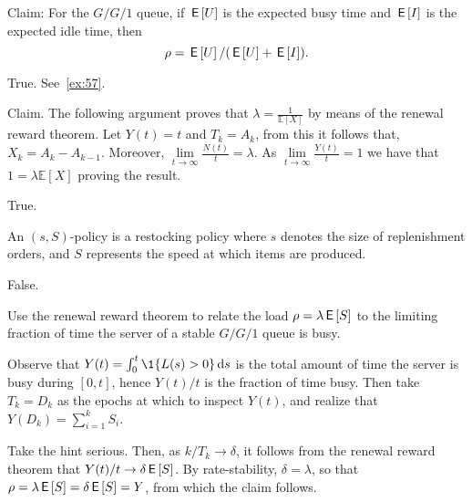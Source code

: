 \documentclass[stochastic-or.tex]{subfiles}
\begin{document}
\begin{truefalse}
Claim:  For the $G/G/1$ queue, if $\,\mathsf{E}\left[U\right]$ is the expected busy time and
 $\,\mathsf{E}\left[I\right]$ is the expected idle time, then
\begin{equation*}
\rho =  \,\mathsf{E}\left[U\right] / (\,\mathsf{E}\left[U\right] +\,\mathsf{E}\left[I\right]).
\end{equation*}
\begin{solution} True. See~\cref{ex:57}.
\end{solution}
\end{truefalse}

\begin{truefalse}
Claim.
The following argument proves that $\lambda=\frac{1}{\mathbb{E}[X]}$ by means of the renewal reward theorem.
Let $Y(t)=t$ and $T_k=A_k$, from this it follows that, $X_k=A_k-A_{k-1}$.
Moreover, $\lim\limits_{t\to\infty}\frac{N(t)}{t}=\lambda$.
As $\lim\limits_{t\to\infty}\frac{Y(t)}{t}=1$ we have that $1=\lambda\mathbb{E}[X]$ proving the result.
    \begin{solution}
        True.
    \end{solution}
\end{truefalse}

\begin{truefalse}
    An $(s,S)$-policy is a restocking policy where $s$ denotes the size of replenishment orders, and $S$ represents the speed at which items are produced.
    \begin{solution}
        False.
    \end{solution}
\end{truefalse}


\begin{exercise}
Use the renewal reward theorem to relate the load $\rho=\lambda \,\mathsf{E}\left[S\right]$ to the limiting fraction of time the server of a stable $G/G/1$ queue is busy.
\begin{hint}
Observe that $Y(t) = \int_0^t \1{\L(s)>0} \d s$ is the total amount of time the server is busy during $[0,t]$, hence $Y(t)/t$ is the fraction of time busy.
Then take $T_k = D_k$ as the epochs at which to inspect $Y(t)$, and realize that $Y(D_{k}) = \sum_{i=1}^{k} S_{i}$.
\end{hint}
\begin{solution}
Take the hint serious. Then, as $k/T_{k} \to \delta$, it follows from the renewal reward theorem that $Y(t)/t \to \delta \,\mathsf{E}\left[S\right]$.
By rate-stability, $\delta = \lambda$, so that $\rho=\lambda \,\mathsf{E}\left[S\right] = \delta \,\mathsf{E}\left[S\right] = Y$, from which the claim follows.

\end{solution}
\end{exercise}
\end{document}
